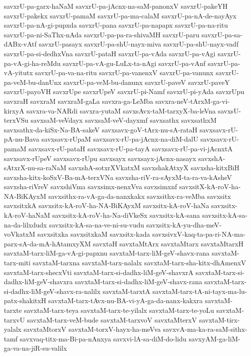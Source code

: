 {savxrU-pa-garx-haNaM
savxrU-pa-jAcnx-na-saM-panonxV
savxrU-pakeYH
savxrU-pakekx
savxrU-pamaM
savxrU-pa-ma-calaM
savxrU-pa-nA-de-nayAyx
savxrU-pa-nA-gi-pupxda
savxrU-pana
savxrU-pa-napapx
savxrU-pa-na-ritu
savxrU-pa-ni-SaThx-nAda
savxrU-pa-pa-ra-shivaMH
savxrU-paru
savxrU-pa-sa-dABx-vAtf
savxrU-pasayx
savxrU-pa-shU-nayx-miva
savxrU-pa-shU-nayx-vadf
savxrU-pa-si-dedhxVna
savxrU-pataH
savxrU-pa-vAda
savxrU-pa-vAgi
savxrU-pa-vA-gi-ha-reMdu
savxrU-pa-vA-gu-LuLx-ta-nAgi
savxrU-pa-vAnf
savxrU-pa-vA-yitutx
savxrU-pa-va-na-ritu
savxrU-pa-vanenxV
savxrU-pa-vanunx
savxrU-pa-veM-bu-danUnx
savxrU-pa-veM-bu-danunx
savxrU-paveV
savxrU-paveY
savxrU-payoVH
savxrUpe
savxrUpeV
savxrU-pi-Namf
savxrU-pi-yAda
savxrUpu
savxraH
savxraM
savxraM-gaLa
savxra-ga-LeMba
savxra-neV-tArxM-ga-vi-kirxyA
savxra-va-NARdi
savxra-yutaM
savxsAvx-taM-tarxyX-ba-leVna
savxsU-terxVSu
savxsaM-veVdayx
savxsaM-veV-dayxmf
savxsathx
savxsathxM
savxsathx-da-kiSx-Na-BA-sakeV
savxsavx-goV-tArx-nu-sA-rataH
savxsavx-rU-pA-nu-Bava
savxsavx-rUpaM
savxsavx-rU-pa-jAcnx-na-diM-dalU
savxsavx-rU-pamaM
savxsavx-rU-pataH
savxsavx-rU-pa-tayA
savxsavx-rU-pa-vi-jAcnxtA
savxsavx-rUpeV
savxsavx-rUpu
savxsayx
savxsayx-jAcnx-nasayx
savxshA-sAtxrX-nu-sa-raNaM
savxshA-sotxrXVkatxM
savxshakAtxyX
savxsha-kitxBiH
savxsha-kitx-koSxV-Ba-mA-terxVNa
savxsha-riV-ra-sAyxM-ta-ra-va-kAsheV
savxsha-riVreV
savxshiVma
savxsimx-nenxVva
savxsimxnf
savxsitX-kA-roV-ha-NA-BiKAyxM
savxsithx-ra-vA-ga-da-nanxkakx
savxsithx-ra-veMba
savxsitx
savxsitxkA
savxsitx-kA-roV-ha-NA-BiKAyxM
savxsitx-kA-roV-haNa
savxsitx-kA-roV-haNaM
savxsitx-kA-roV-ha-Na-diVkeSx
savxsitx-kA-sana
savxsitx-kA-sa-na-da-lilxdudx
savxsitx-kA-sa-na-ve-ni-su-vudu
savxsitx-kA-yu-dha-meV-voVkatxM
savxsitxka
savxsitxkaM
savxsitx-kada
savxsivxV-kaq-ta-pa-ri-NA-ma-parx-sA-da-mA-hAtamxyXM
savxtaH
savxtaMtArx
savxtaMtarx
savxtaMtarxH
savxtaM-tarx-liM-ga-vA-gi-papxnu
savxtaM-tarx-liM-geV-shavx-rana
savxtaM-tarx-miti
savxtaM-tarxna
savxtaM-tarx-nalalx
savxtaM-tarx-sha-kitx-dhAmenxV
savxtaM-tarx-shecxVti
savxtaM-tarx-si-dadhx-liM-geV-shavxrA
savxtaM-tarx-si-dadhx-liM-geV-shavxra
savxtaM-tarx-si-dadhx-liM-geV-shavx-rana
savxtaM-tarx-si-dadhx-liM-geV-shavx-ra-nalilx
savxtaM-tarxtA
savxtaM-tarx-tA-ni-tayx-ma-lu-patx-shakitxH
savxtaM-tarx-tAvx-nu-BA-vi-yA-ga-da-nanx-kakxra
savxtaM-tarxte
savxtaM-tarx-teya
savxtaM-tarx-te-yilalx
savxtaM-tarx-te-yoLu
savxtaM-tarxvU
savxtaM-tarx-veM-bude
savxtaM-tarxvoV
savxtaMterxV
savxtaM-tirx-yalalx
savxtaMtorxV
savxtaM-torxV-hayx-ha-meVva
savxvA-ma-ka-ra-saM-sithx-tamf
savxvaq-titx-ma-Bi-pa-nAnxya
savxvi-lA-sa-diM-do-lidu
savxyAM-ga-liM-ga-va-na-jiR-su-valilx
}
